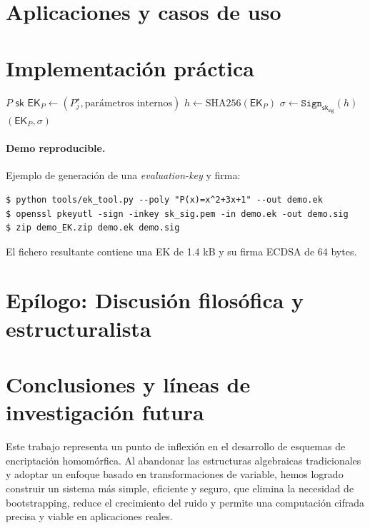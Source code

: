 \documentclass[11pt]{article}
\theoremstyle{plain}
\begin{document}
\section{Aplicaciones y casos de uso}

\section{Implementación práctica}

\begin{algorithm}[H]
\caption{\textsc{DeriveEK}$(P,\mathsf{sk})$}
\begin{algorithmic}[1]
\Require $P$ 
\Require $\mathsf{sk}$ 
\State $\mathsf{EK}_P \gets (P_j^\star,\text{parámetros internos})$
\State $h \gets \mathrm{SHA256}(\mathsf{EK}_P)$
\State $\sigma \gets \texttt{Sign}_{\mathsf{sk_{sig}}}(h)$
\State \Return $(\mathsf{EK}_P,\sigma)$
\end{algorithmic}
\end{algorithm}

\paragraph{Demo reproducible.} Ejemplo de generación de una \emph{evaluation-key} y firma:
\begin{verbatim}
$ python tools/ek_tool.py --poly "P(x)=x^2+3x+1" --out demo.ek
$ openssl pkeyutl -sign -inkey sk_sig.pem -in demo.ek -out demo.sig
$ zip demo_EK.zip demo.ek demo.sig
\end{verbatim}
El fichero resultante contiene una EK de 1.4 kB y su firma ECDSA de 64 bytes.

\section{Epílogo: Discusión filosófica y estructuralista}

\section{Conclusiones y líneas de investigación futura}
Este trabajo representa un punto de inflexión en el desarrollo de esquemas de encriptación homomórfica. Al abandonar las estructuras algebraicas tradicionales y adoptar un enfoque basado en transformaciones de variable, hemos logrado construir un sistema más simple, eficiente y seguro, que elimina la necesidad de bootstrapping, reduce el crecimiento del ruido y permite una computación cifrada precisa y viable en aplicaciones reales.
\end{document}
